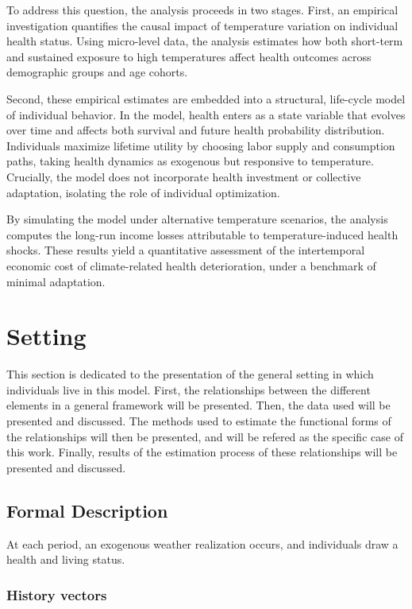 \documentclass{article}
\begin{document}
To address this question, the analysis proceeds in two stages.
First, an empirical investigation quantifies the causal impact of temperature variation on individual health status.
Using micro-level data, the analysis estimates how both short-term and sustained exposure to high temperatures affect health outcomes across demographic groups and age cohorts.

Second, these empirical estimates are embedded into a structural, life-cycle model of individual behavior.
In the model, health enters as a state variable that evolves over time and affects both survival and future health probability distribution.
Individuals maximize lifetime utility by choosing labor supply and consumption paths, taking health dynamics as exogenous but responsive to temperature.
Crucially, the model does not incorporate health investment or collective adaptation, isolating the role of individual optimization.

By simulating the model under alternative temperature scenarios, the analysis computes the long-run income losses attributable to temperature-induced health shocks. These results yield a quantitative assessment of the intertemporal economic cost of climate-related health deterioration, under a benchmark of minimal adaptation.

\section{Setting}

This section is dedicated to the presentation of the general setting
in which individuals live in this model.
First, the relationships between the different elements in a general framework will be presented.
Then, the data used will be presented and discussed. 
The methods used to estimate the functional forms of the relationships will then be 
presented, and will be refered as the specific case of this work.
Finally, results of the estimation process of these relationships will be presented and discussed.

\subsection{Formal Description}

At each period, an exogenous weather realization occurs, and individuals draw a health and living status. 

\subsubsection{History vectors}
\end{document}
